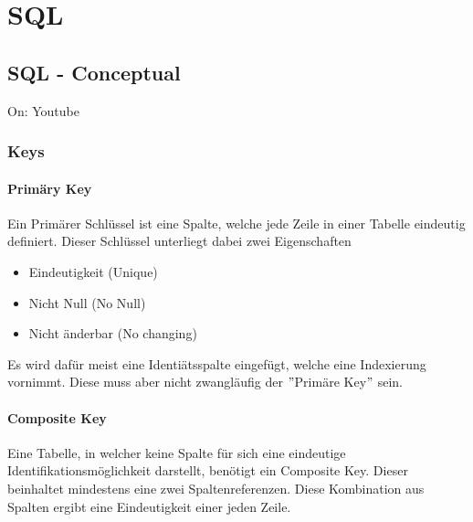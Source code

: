 \pagebreak
\chapter{SQL}
\setcounter{section}{0}

\section{SQL - Conceptual}
On: Youtube
\subsection{Keys}

\subsubsection{Primäry Key}
Ein Primärer Schlüssel ist eine Spalte, welche jede Zeile in einer Tabelle eindeutig definiert. Dieser Schlüssel unterliegt dabei zwei Eigenschaften
\begin{itemize}
\item Eindeutigkeit (Unique)
\item Nicht Null (No Null)
\item Nicht änderbar (No changing)
\end{itemize}
Es wird dafür meist eine Identiätsspalte eingefügt, welche eine Indexierung vornimmt. Diese muss aber nicht zwangläufig der $"$Primäre Key$"$ sein.


\subsubsection{Composite Key}
Eine Tabelle, in welcher keine Spalte für sich eine eindeutige Identifikationsmöglichkeit darstellt, benötigt ein Composite Key. Dieser beinhaltet mindestens eine zwei Spaltenreferenzen. Diese Kombination aus Spalten ergibt eine Eindeutigkeit einer jeden Zeile. 

